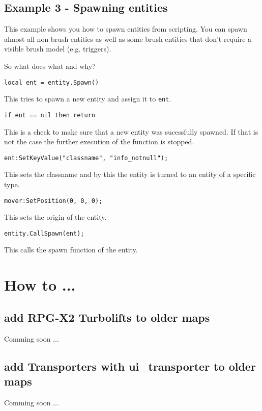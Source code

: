 \documentclass{scrreprt}
\begin{document}
\section{Example 3 - Spawning entities}
This example shows you how to spawn entities from scripting. You can spawn almost all non brush entities as well as some brush entities that don't require a visible brush model (e.g. triggers).

\newpage
So what does what and why?
\newline
\begin{lstlisting}
local ent = entity.Spawn()
\end{lstlisting}
This tries to spawn a new entity and assign it to \lstinline|ent|.
\newline
\begin{lstlisting}
if ent == nil then return
\end{lstlisting} 
This is a check to make sure that a new entity was sucessfully spawned. If that is not the case the further execution of the function is stopped.
\newline
\begin{lstlisting}
ent:SetKeyValue("classname", "info_notnull");
\end{lstlisting} 
This sets the classname and by this the entity is turned to an entity of a specific type.
\newline
\begin{lstlisting}
mover:SetPosition(0, 0, 0);
\end{lstlisting} 
This sets the origin of the entity.
\newline
\begin{lstlisting}
entity.CallSpawn(ent);
\end{lstlisting}
This calls the spawn function of the entity.
\chapter{How to ...}
\label{howto}
\section{add RPG-X2 Turbolifts to older maps}
\label{howto-x2turbo}
Comming soon ...
\section{add Transporters with ui\_transporter to older maps}
\label{howto-uitrans}
Comming soon ...
\end{document}
